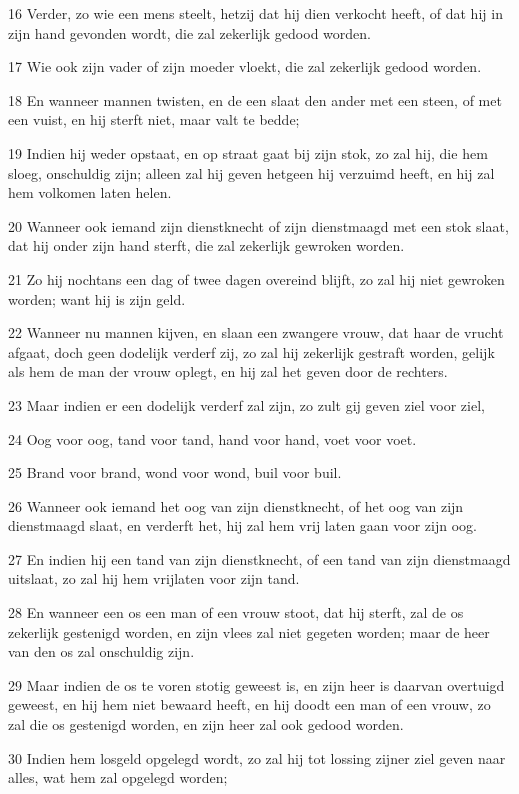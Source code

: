 \par 16 Verder, zo wie een mens steelt, hetzij dat hij dien verkocht heeft, of dat hij in zijn hand gevonden wordt, die zal zekerlijk gedood worden.
\par 17 Wie ook zijn vader of zijn moeder vloekt, die zal zekerlijk gedood worden.
\par 18 En wanneer mannen twisten, en de een slaat den ander met een steen, of met een vuist, en hij sterft niet, maar valt te bedde;
\par 19 Indien hij weder opstaat, en op straat gaat bij zijn stok, zo zal hij, die hem sloeg, onschuldig zijn; alleen zal hij geven hetgeen hij verzuimd heeft, en hij zal hem volkomen laten helen.
\par 20 Wanneer ook iemand zijn dienstknecht of zijn dienstmaagd met een stok slaat, dat hij onder zijn hand sterft, die zal zekerlijk gewroken worden.
\par 21 Zo hij nochtans een dag of twee dagen overeind blijft, zo zal hij niet gewroken worden; want hij is zijn geld.
\par 22 Wanneer nu mannen kijven, en slaan een zwangere vrouw, dat haar de vrucht afgaat, doch geen dodelijk verderf zij, zo zal hij zekerlijk gestraft worden, gelijk als hem de man der vrouw oplegt, en hij zal het geven door de rechters.
\par 23 Maar indien er een dodelijk verderf zal zijn, zo zult gij geven ziel voor ziel,
\par 24 Oog voor oog, tand voor tand, hand voor hand, voet voor voet.
\par 25 Brand voor brand, wond voor wond, buil voor buil.
\par 26 Wanneer ook iemand het oog van zijn dienstknecht, of het oog van zijn dienstmaagd slaat, en verderft het, hij zal hem vrij laten gaan voor zijn oog.
\par 27 En indien hij een tand van zijn dienstknecht, of een tand van zijn dienstmaagd uitslaat, zo zal hij hem vrijlaten voor zijn tand.
\par 28 En wanneer een os een man of een vrouw stoot, dat hij sterft, zal de os zekerlijk gestenigd worden, en zijn vlees zal niet gegeten worden; maar de heer van den os zal onschuldig zijn.
\par 29 Maar indien de os te voren stotig geweest is, en zijn heer is daarvan overtuigd geweest, en hij hem niet bewaard heeft, en hij doodt een man of een vrouw, zo zal die os gestenigd worden, en zijn heer zal ook gedood worden.
\par 30 Indien hem losgeld opgelegd wordt, zo zal hij tot lossing zijner ziel geven naar alles, wat hem zal opgelegd worden;
